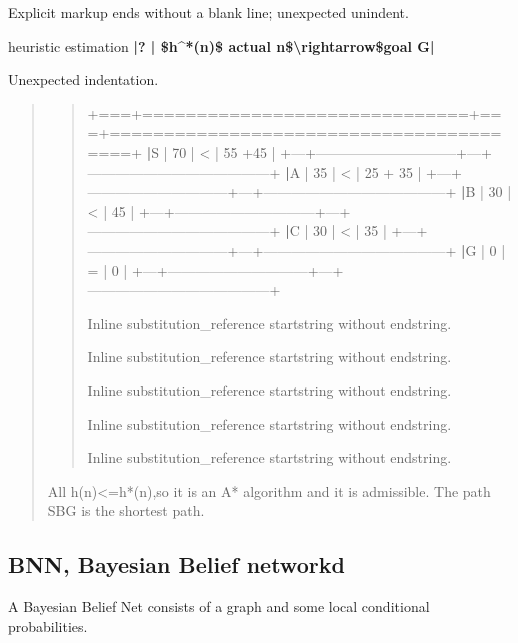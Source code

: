 \documentclass[letterpaper,10pt,english]{sphinxmanual}
\begin{document}
\sphinxAtStartPar
Explicit markup ends without a blank line; unexpected unindent.


\sphinxAtStartPar
heuristic estimation  {\color{red}\bfseries{}|?  | \$h\textasciicircum{}*(n)\$
actual n\$\textbackslash{}rightarrow\$goal G|}

\sphinxAtStartPar
Unexpected indentation.

\begin{quote}
\begin{quote}

\sphinxAtStartPar
+===+==============================+===+========================================+
{\color{red}\bfseries{}|}S  | 70                           | < | 55 +45                                 |
+—+——————————+—+—————————————\sphinxhyphen{}+
{\color{red}\bfseries{}|}A  | 35                           | < | 25 + 35                                |
+—+——————————+—+—————————————\sphinxhyphen{}+
{\color{red}\bfseries{}|}B  | 30                           | < | 45                                     |
+—+——————————+—+—————————————\sphinxhyphen{}+
{\color{red}\bfseries{}|}C  | 30                           | < | 35                                     |
+—+——————————+—+—————————————\sphinxhyphen{}+
{\color{red}\bfseries{}|}G  | 0                            | = | 0                                      |
+—+——————————+—+—————————————\sphinxhyphen{}+

\sphinxAtStartPar
Inline substitution\_reference start\sphinxhyphen{}string without end\sphinxhyphen{}string.


\sphinxAtStartPar
Inline substitution\_reference start\sphinxhyphen{}string without end\sphinxhyphen{}string.


\sphinxAtStartPar
Inline substitution\_reference start\sphinxhyphen{}string without end\sphinxhyphen{}string.


\sphinxAtStartPar
Inline substitution\_reference start\sphinxhyphen{}string without end\sphinxhyphen{}string.


\sphinxAtStartPar
Inline substitution\_reference start\sphinxhyphen{}string without end\sphinxhyphen{}string.

\end{quote}

\sphinxAtStartPar
All h(n)<=h*(n),so it is an A* algorithm and it is admissible. The path S\sphinxhyphen{}B\sphinxhyphen{}G is the shortest path.
\end{quote}


\subsection{BNN, Bayesian Belief networkd}
\label{\detokenize{AI/main:bnn-bayesian-belief-networkd}}
\sphinxAtStartPar
A Bayesian Belief Net consists of a graph and some local conditional probabilities.
\end{document}
